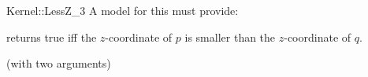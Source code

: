 \begin{ccRefFunctionObjectConcept}{Kernel::LessZ_3}
A model for this must provide:


{returns true iff the $z$-coordinate of $p$ is smaller than the
$z$-coordinate of $q$.}

\ccRefines
{} (with two arguments)

\ccSeeAlso
{}\\

\end{ccRefFunctionObjectConcept}
